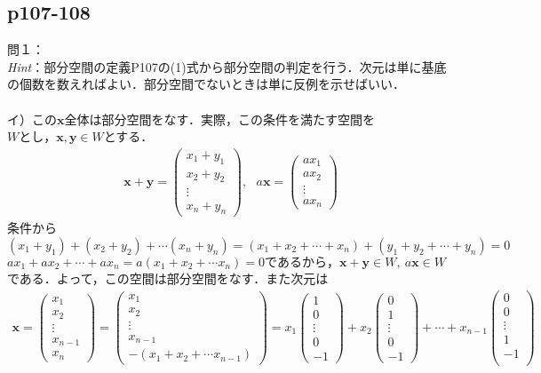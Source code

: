 \documentclass[dvipdfmx,uplatex,11pt]{jsarticle}
\theoremstyle{definition}
\begin{document}
\subsection{p107-108}
\noindent
問１：\\
\textsl{Hint}：部分空間の定義P107の(1)式から部分空間の判定を行う．次元は単に基底の個数を数えればよい．部分空間でないときは単に反例を示せばいい．\\
\dotfill \\
イ）この$\bm{x}全体は$部分空間をなす．実際，この条件を満たす空間を$Wとし，\bm{x,y} \in W$とする．
\begin{eqnarray*}
\bm{x}+\bm{y}=
\begin{pmatrix}
x_1+y_1 \\
x_2+y_2 \\
\vdots \\
x_n+y_n
\end{pmatrix}
,~~~
a\bm{x}=
\begin{pmatrix}
ax_1 \\
ax_2 \\
\vdots \\
ax_n
\end{pmatrix}
\end{eqnarray*}
条件から$(x_1+y_1)+(x_2+y_2)+\cdots (x_n+y_n)=(x_1+x_2+\cdots +x_n)+(y_1+y_2+\cdots +y_n)=0$\\
$ax_1+ax_2+ \cdots +ax_n=a(x_1+x_2+\cdots x_n)=0であるから，\bm{x}+\bm{y} \in W,~a\bm{x} \in W$である．よって，この空間は部分空間をなす．また次元は
\begin{eqnarray*}
\bm{x}=
\begin{pmatrix}
x_1 \\
x_2 \\
\vdots \\
x_{n-1} \\
x_n
\end{pmatrix}
=
\begin{pmatrix}
x_1 \\
x_2 \\
\vdots \\
x_{n-1} \\
-(x_1+x_2+\cdots x_{n-1})
\end{pmatrix}
=
x_1
\begin{pmatrix}
1 \\
0 \\
\vdots \\
0 \\
-1
\end{pmatrix}
+x_2
\begin{pmatrix}
0 \\
1 \\
\vdots \\
0 \\
-1
\end{pmatrix}
+\cdots +x_{n-1}
\begin{pmatrix}
0 \\
0 \\
\vdots \\
1 \\
-1\\
\end{pmatrix}
\end{eqnarray*}
\end{document}
